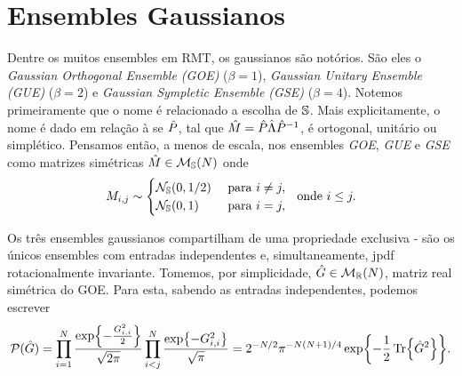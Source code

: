 \section{Ensembles Gaussianos}
\label{Section: Ensembles Gaussianos}

Dentre os muitos ensembles em RMT, os gaussianos são notórios. São eles o \textit{Gaussian Orthogonal Ensemble (GOE)} ($\beta=1$), \textit{Gaussian Unitary Ensemble (GUE)} ($\beta=2$) e \textit{Gaussian Sympletic Ensemble (GSE)} ($\beta=4$). Notemos primeiramente que o nome é relacionado a escolha de $\mathbb{S}$. Mais explicitamente, o nome é dado em relação à se $\hat P$, tal que $\hat M = \hat P\hat\Lambda\hat P^{-1}$, é ortogonal, unitário ou simplético. Pensamos então, a menos de escala, nos ensembles \textit{GOE}, \textit{GUE} e \textit{GSE} como matrizes simétricas $\hat M \in \mathcal{M}_{\mathbb{S}}(N)$ onde 
$$
M_{i,j} \sim
\begin{cases}
	\mathcal{N}_{\mathbb{S}}(0,1/2) &  \ \text{para} \ i \neq j,\\
	\mathcal{N}_{\mathbb{S}}(0,1) & \ \text{para} \ i = j,
\end{cases}
\ \ \text{onde} \ i \leq j.
$$

Os três ensembles gaussianos compartilham de uma propriedade exclusiva - são os únicos ensembles com entradas independentes e, simultaneamente, jpdf rotacionalmente invariante. Tomemos, por simplicidade, $\hat G \in \mathcal{M}_{\mathbb{R}}(N)$, matriz real simétrica do GOE. Para esta, sabendo as entradas independentes, podemos escrever $$\mathcal{P}(\hat G) = \prod_{i=1}^{N}\frac{\exp{-\frac{G_{i,i}^2}{2}}}{\sqrt{2\pi}} \prod_{i<j}^{N} \frac{\exp{-G_{i,i}^2}}{\sqrt{\pi}} = 2^{-N/2} \pi^{-N(N + 1)/4} \exp{-\frac{1}{2} \Tr{\hat G^2}}.$$

